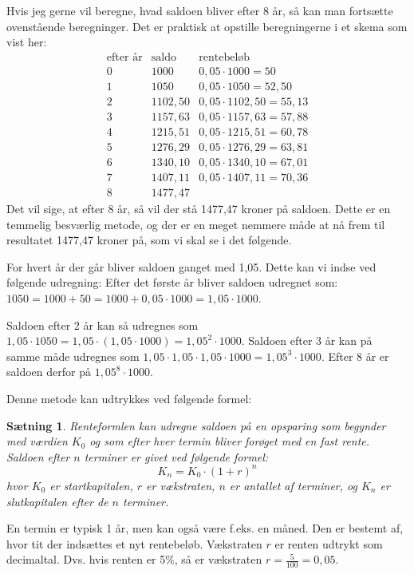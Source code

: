 \documentclass[12pt,oneside,a4paper]{article}
\newtheorem{thm}{Sætning}[section]
\begin{document}
Hvis jeg gerne vil beregne, hvad saldoen bliver efter 8 år, så kan man fortsætte ovenstående
beregninger. Det er praktisk at opstille beregningerne i et skema som vist her:
$$
\begin{array}{r|c|l}
    \mbox{efter år} & \mbox{saldo} & \mbox{rentebeløb} \\
    \hline
0 & 1000 & 0,05\cdot 1000 = 50 \\
    \hline
1 & 1050 & 0,05\cdot 1050 = 52,50 \\
    \hline
2 & 1102,50 & 0,05\cdot 1102,50 = 55,13 \\
    \hline
3 & 1157,63 & 0,05\cdot 1157,63 = 57,88 \\
    \hline
4 & 1215,51 & 0,05\cdot 1215,51 = 60,78 \\
    \hline
5 & 1276,29 & 0,05\cdot 1276,29 = 63,81 \\
    \hline
6 & 1340,10 & 0,05\cdot 1340,10 = 67,01 \\
    \hline
7 & 1407,11 & 0,05\cdot 1407,11 = 70,36 \\
    \hline
8 & 1477,47 & 
\end{array}
$$
Det vil sige, at efter 8 år, så vil der stå 1477,47 kroner på saldoen.
Dette er en temmelig besværlig metode, og der er en meget nemmere måde at nå frem til
resultatet 1477,47 kroner på, som vi skal se i det følgende.

For hvert år der går bliver saldoen ganget med
1,05. Dette kan vi indse ved følgende udregning: Efter det første år bliver
saldoen udregnet som: $1050 = 1000 + 50 = 1000 + 0,05\cdot 1000 = 1,05 \cdot 1000$.

Saldoen efter 2 år kan så udregnes som $1,05\cdot 1050 = 1,05 \cdot (1,05 \cdot
1000) = 1,05^2 \cdot 1000$. Saldoen efter 3 år kan på samme måde udregnes som
$1,05\cdot1,05\cdot1,05\cdot 1000 = 1,05^3 \cdot 1000$. Efter 8 år er saldoen
derfor på $1,05^8\cdot 1000$.

Denne metode kan udtrykkes ved følgende formel:
\begin{thm}
    {\em Renteformlen} kan udregne saldoen på en opsparing som begynder med
    værdien $K_0$ og som efter hver {\em termin} bliver forøget med en fast
    rente. Saldoen efter $n$ terminer er givet ved følgende formel:
    $$
    K_n = K_0 \cdot (1+r)^n
    $$
    hvor $K_0$ er {\em startkapitalen}, $r$ er {\em vækstraten}, $n$ er antallet af
    terminer, og $K_n$ er {\em slutkapitalen} efter de $n$ terminer.
\end{thm}
En termin er typisk 1 år, men kan også være f.eks. en måned. Den er bestemt af,
hvor tit der indsættes et nyt rentebeløb. Vækstraten $r$ er renten udtrykt som
decimaltal. Dvs. hvis renten er 5\%, så er vækstraten $r=\frac{5}{100}=0,05$.
\end{document}
